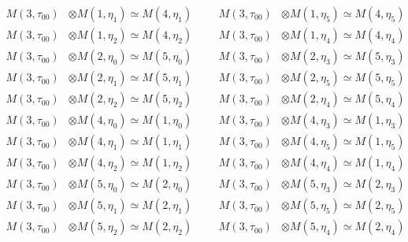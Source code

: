 \begin{align*}
M(3,\tau_{00}) &\otimes M(1,\eta_{1}) \simeq M(4,\eta_{1}) &&& M(3,\tau_{00}) &\otimes M(1,\eta_{5}) \simeq M(4,\eta_{5})\\
M(3,\tau_{00}) &\otimes M(1,\eta_{2}) \simeq M(4,\eta_{2}) &&& M(3,\tau_{00}) &\otimes M(1,\eta_{4}) \simeq M(4,\eta_{4})\\
M(3,\tau_{00}) &\otimes M(2,\eta_{0}) \simeq M(5,\eta_{0}) &&& M(3,\tau_{00}) &\otimes M(2,\eta_{3}) \simeq M(5,\eta_{3})\\
M(3,\tau_{00}) &\otimes M(2,\eta_{1}) \simeq M(5,\eta_{1}) &&& M(3,\tau_{00}) &\otimes M(2,\eta_{5}) \simeq M(5,\eta_{5})\\
M(3,\tau_{00}) &\otimes M(2,\eta_{2}) \simeq M(5,\eta_{2}) &&& M(3,\tau_{00}) &\otimes M(2,\eta_{4}) \simeq M(5,\eta_{4})\\
M(3,\tau_{00}) &\otimes M(4,\eta_{0}) \simeq M(1,\eta_{0}) &&& M(3,\tau_{00}) &\otimes M(4,\eta_{3}) \simeq M(1,\eta_{3})\\
M(3,\tau_{00}) &\otimes M(4,\eta_{1}) \simeq M(1,\eta_{1}) &&& M(3,\tau_{00}) &\otimes M(4,\eta_{5}) \simeq M(1,\eta_{5})\\
M(3,\tau_{00}) &\otimes M(4,\eta_{2}) \simeq M(1,\eta_{2}) &&& M(3,\tau_{00}) &\otimes M(4,\eta_{4}) \simeq M(1,\eta_{4})\\
M(3,\tau_{00}) &\otimes M(5,\eta_{0}) \simeq M(2,\eta_{0}) &&& M(3,\tau_{00}) &\otimes M(5,\eta_{3}) \simeq M(2,\eta_{3})\\
M(3,\tau_{00}) &\otimes M(5,\eta_{1}) \simeq M(2,\eta_{1}) &&& M(3,\tau_{00}) &\otimes M(5,\eta_{5}) \simeq M(2,\eta_{5})\\
M(3,\tau_{00}) &\otimes M(5,\eta_{2}) \simeq M(2,\eta_{2}) &&& M(3,\tau_{00}) &\otimes M(5,\eta_{4}) \simeq M(2,\eta_{4})\\
\end{align*}

